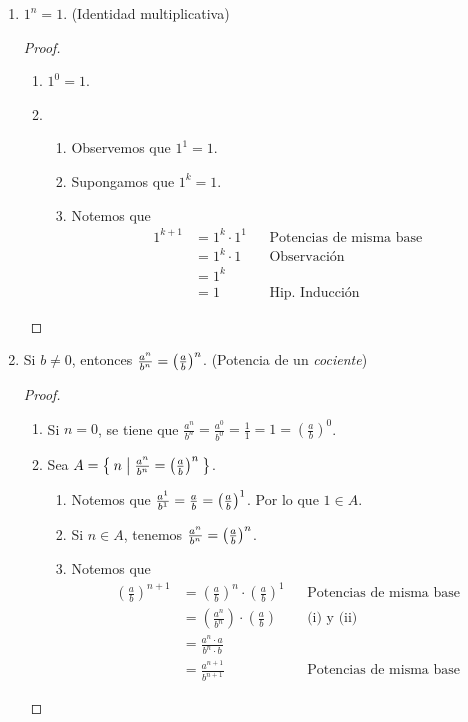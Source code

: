 \begin{enumerate}[label=\alph*)]
  \item $1^n = 1$. (Identidad multiplicativa)
 \begin{proof}\leavevmode
  \begin{enumerate}[label=\Roman*)]
    \item $1^0=1$.
    \item \begin{enumerate}[label=\roman*)]
      \item Observemos que $1^1=1$.
      \item Supongamos que $1^k=1$.
      \item Notemos que
      \begin{align*}
        1^{k+1} &= 1^k \cdot 1^1 && \text{Potencias de misma base}\\
        &= 1^k \cdot 1 && \text{Observación}\\
        &= 1^k\\
        &= 1 && \text{Hip. Inducción}
      \end{align*}
    \end{enumerate}
  \end{enumerate}
 \end{proof}
 

 \item Si $b\neq 0$, entonces $\frac{a^n}{b^n}= \qty(\frac{a}{b})^n$. (Potencia de un \textit{cociente})
 \begin{proof}\leavevmode
  \begin{enumerate}[label=\Roman*)]
    \item Si $n=0$, se tiene que $\frac{a^n}{b^n} = \frac{a^0}{b^0} = \frac{1}{1} = 1 = \left(\frac{a}{b}\right)^0$.
    \item Sea $A=\Set{n|\frac{a^n}{b^n}= \qty(\frac{a}{b})^n}$.
    \begin{enumerate}[label=\roman*)]
    \item Notemos que $\frac{a^1}{b^1}= \frac{a}{b}= \qty(\frac{a}{b})^1$. Por lo que $1\in A$.
    \item Si $n\in A$, tenemos $\frac{a^n}{b^n}= \qty(\frac{a}{b})^n$.
    \item Notemos que
    \begin{align*}
     \left(\frac{a}{b}\right)^{n+1} &= \left(\frac{a}{b}\right)^n \cdot \left(\frac{a}{b}\right)^1 && \text{Potencias de misma base}\\
     &= \left(\frac{a^n}{b^n} \right)\cdot \left(\frac{a}{b}\right) && \text{(i) y (ii)}\\
     &= \frac{a^n\cdot a}{b^n \cdot b}\\
     &= \frac{a^{n+1}}{b^{n+1}} && \text{Potencias de misma base}
    \end{align*}
    \end{enumerate}
  \end{enumerate}
 \end{proof}
 

\end{enumerate}
